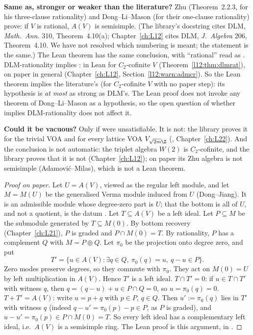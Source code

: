 \begin{dictionary}
\textbf{Same as, stronger or weaker than the literature?} Zhu (Theorem~2.2.3, for his three-clause rationality) and
Dong--Li--Mason (for their one-clause rationality) prove: if $V$ is rational, $A(V)$ is semisimple. (The library's docstring
cites DLM, \emph{Math.\ Ann.} 310, Theorem~4.10(a); Chapter~\ref{ch:L12} cites DLM, \emph{J.~Algebra} 206, Theorem~4.10. We have
not resolved which numbering is meant; the statement is the same.) The Lean theorem has the same conclusion, with ``rational''
read as . DLM-rationality implies : in Lean for $C_2$-cofinite $V$
(Theorem~\ref{l12:thm:dlmrat}), on paper in general (Chapter~\ref{ch:L12}, Section~\ref{l12:warn:admcr}). So the Lean
theorem implies the literature's (for $C_2$-cofinite $V$ with no paper step): its hypothesis is
\emph{at most} as strong as DLM's. The Lean proof does not invoke any theorem of Dong--Li--Mason as a hypothesis, so the open
question of whether  implies DLM-rationality does not affect it.

\textbf{Could it be vacuous?} Only if  were unsatisfiable. It is not: the library proves it for the
trivial VOA and for every lattice VOA $V_{\sqrt{2m}\Z}$ (, Chapter~\ref{ch:L22}). And the
conclusion is not automatic: the triplet algebra $W(2)$ is $C_2$-cofinite, and the library proves that it is not
 (Chapter~\ref{ch:L12}); on paper its Zhu algebra is not semisimple (Adamovi\'c--Milas), which is
not a Lean theorem.
\end{dictionary}

\begin{proof}[Proof on paper]
Let $U=A(V)$, viewed as the regular left module, and let $M=M(U)$ be the generalised Verma module induced from $U$
(Dong--Jiang). It is an admissible module whose degree-zero part is $U$; that the bottom is all of $U$, and not a quotient,
is the datum . Let $T\subseteq A(V)$ be a left ideal. Let $P\subseteq M$ be the submodule generated by $T\subseteq
M(0)$. By bottom recovery (Chapter~\ref{ch:L21}), $P$ is graded and $P\cap M(0)=T$. By rationality, $P$ has a complement $Q$
with $M=P\oplus Q$. Let $\pi_0$ be the projection onto degree zero, and put
\begin{equation*}
  T'=\{u\in A(V) : \exists q\in Q,\ \pi_0(q)=u,\ q-u\in P\}.
\end{equation*}
Zero modes preserve degrees, so they commute with $\pi_0$. They act on $M(0)=U$ by left multiplication in $A(V)$. Hence $T'$ is
a left ideal. $T\cap T'=0$: if $u\in T\cap T'$ with witness $q$, then $q=(q-u)+u\in P\cap Q=0$, so $u=\pi_0(q)=0$. $T+T'=A(V)$:
write $u=p+q$ with $p\in P$, $q\in Q$. Then $u':=\pi_0(q)$ lies in $T'$ with witness $q$ (indeed
$q-u'=\pi_0(p)-p\in P$, as $P$ is graded), and $u-u'=\pi_0(p)\in P\cap M(0)=T$.
So every left ideal has a complementary left ideal, i.e.\ $A(V)$ is a semisimple ring. The Lean proof is this argument, in
.
\end{proof}

